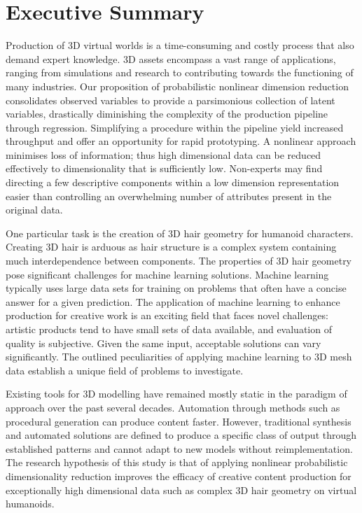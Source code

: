 \documentclass[ %
author={Dillon Keith Diep},
supervisor={Dr. Carl Henrik Ek},
degree={MEng},
title={ART-CG Hair:},
subtitle={Assisted Real-time Content Generation of Stylised Virtual Hair},
type={Research},
year={2017} ]{dissertation}
\begin{document}
	\chapter*{Executive Summary}
	Production of 3D virtual worlds is a time-consuming and costly process that also demand expert knowledge. 3D assets encompass a vast range of applications, ranging from simulations and research to contributing towards the functioning of many industries. Our proposition of probabilistic nonlinear dimension reduction consolidates observed variables to provide a parsimonious collection of latent variables, drastically diminishing the complexity of the production pipeline through regression. Simplifying a procedure within the pipeline yield increased throughput and offer an opportunity for rapid prototyping. A nonlinear approach minimises loss of information; thus high dimensional data can be reduced effectively to dimensionality that is sufficiently low. Non-experts may find directing a few descriptive components within a low dimension representation easier than controlling an overwhelming number of attributes present in the original data.
	
	One particular task is the creation of 3D hair geometry for humanoid characters. Creating 3D hair is arduous as hair structure is a complex system containing much interdependence between components. The properties of 3D hair geometry pose significant challenges for machine learning solutions. Machine learning typically uses large data sets for training on problems that often have a concise answer for a given prediction. The application of machine learning to enhance production for creative work is an exciting field that faces novel challenges: artistic products tend to have small sets of data available, and evaluation of quality is subjective. Given the same input, acceptable solutions can vary significantly. The outlined peculiarities of applying machine learning to 3D mesh data establish a unique field of problems to investigate.
	
	Existing tools for 3D modelling have remained mostly static in the paradigm of approach over the past several decades. Automation through methods such as procedural generation can produce content faster. However, traditional synthesis and automated solutions are defined to produce a specific class of output through established patterns and cannot adapt to new models without reimplementation. The research hypothesis of this study is that of applying nonlinear probabilistic dimensionality reduction improves the efficacy of creative content production for exceptionally high dimensional data such as complex 3D hair geometry on virtual humanoids.
	
\end{document}
